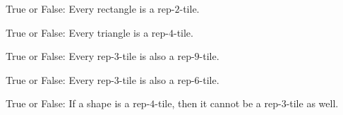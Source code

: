 \documentclass{ximera}
\author{Bart Snapp}
\begin{document}
\maketitle

\begin{exercise}
  True or False: Every rectangle is a rep-$2$-tile.
\end{exercise}
\vfill


\begin{exercise}
  True or False: Every triangle is a rep-$4$-tile.
\end{exercise}
\vfill


\begin{exercise}
  True or False: Every rep-$3$-tile is also a rep-$9$-tile.
\end{exercise}
\vfill


\begin{exercise}
  True or False: Every rep-$3$-tile is also a rep-$6$-tile.
\end{exercise}
\vfill

\begin{exercise}
  True or False: If a shape is a rep-$4$-tile, then it cannot be a
  rep-$3$-tile as well.
\end{exercise}
\vfill



\end{document}
